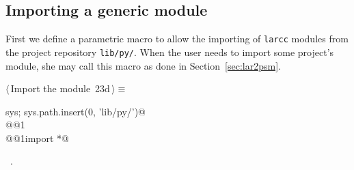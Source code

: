 \documentclass[11pt,oneside]{article}	%
\begin{document}
\subsection{Importing a generic module}
First we define a parametric macro to allow the importing of \texttt{larcc} modules from the project repository \texttt{lib/py/}. When the user needs to import some project's module, she may call this macro as done in Section~\ref{sec:lar2psm}.
\begin{flushleft} \small
\begin{minipage}{\linewidth} \label{scrap40}
\protect{}$\langle\,$Import the module\nobreak\ {\footnotesize 23d}$\,\rangle\equiv$
\vspace{-1ex}
\begin{list}{}{} \item
\mbox{}\verb@import sys; sys.path.insert(0, 'lib/py/')@\\
\mbox{}\verb@import @@1\verb@@\\
\mbox{}\verb@from @@1\verb@ import *@\\
\mbox{}\verb@@{\NWsep}
\end{list}
\vspace{-1ex}
\footnotesize\addtolength{\baselineskip}{-1ex}
\begin{list}{}{\setlength{\itemsep}{-\parsep}\setlength{\itemindent}{-\leftmargin}}
\item \NWtxtMacroRefIn\ .
\end{list}
\end{minipage}\\[4ex]
\end{flushleft}
\end{document}
